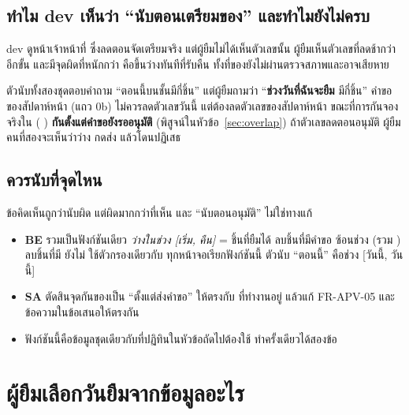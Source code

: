 \subsection{ทำไม dev เห็นว่า ``นับตอนเตรียมของ'' และทำไมยังไม่ครบ}

dev ดูหน้าเจ้าหน้าที่ ซึ่งลดตอนจัดเตรียมจริง แต่ผู้ยืมไม่ได้เห็นตัวเลขนั้น ผู้ยืมเห็นตัวเลขที่ลดช้ากว่าอีกขั้น
และมีจุดผิดที่หนักกว่า คือขึ้นว่างทันทีที่รับคืน ทั้งที่ของยังไม่ผ่านตรวจสภาพและอาจเสียหาย

\begin{warnbox}[title={กับดัก --- ย้ายจุดนับไปตอนอนุมัติ ตัวเลขก็ยังผิด}]
ตัวนับทั้งสองชุดตอบคำถาม ``ตอนนี้บนชั้นมีกี่ชิ้น'' แต่ผู้ยืมถามว่า ``\textbf{ช่วงวันที่ฉันจะยืม} มีกี่ชิ้น''
คำขอของสัปดาห์หน้า (แถว 0b) ไม่ควรลดตัวเลขวันนี้ แต่ต้องลดตัวเลขของสัปดาห์หน้า
ขณะที่การกันจองจริงใน  ( )
\textbf{กันตั้งแต่คำขอยังรออนุมัติ} (พิสูจน์ในหัวข้อ~\ref{sec:overlap}) ถ้าตัวเลขลดตอนอนุมัติ
ผู้ยืมคนที่สองจะเห็นว่าว่าง กดส่ง แล้วโดนปฏิเสธ 
\end{warnbox}

\subsection{ควรนับที่จุดไหน}

\vpart{} ข้อคิดเห็นถูกว่านับผิด แต่ผิดมากกว่าที่เห็น และ ``นับตอนอนุมัติ'' ไม่ใช่ทางแก้

\begin{itemize}
\item \textbf{BE} รวมเป็นฟังก์ชันเดียว \emph{ว่างในช่วง [เริ่ม, คืน]} = ชิ้นที่ยืมได้ ลบชิ้นที่มีคำขอ  ซ้อนช่วง
      (รวม ) ลบชิ้นที่มี  ยังไม่  ใช้ตัวกรองเดียวกับ 
      ทุกหน้าจอเรียกฟังก์ชันนี้ ตัวนับ ``ตอนนี้'' คือช่วง [วันนี้, วันนี้]
\item \textbf{SA} ตัดสินจุดกันของเป็น ``ตั้งแต่ส่งคำขอ'' ให้ตรงกับ  ที่ทำงานอยู่ แล้วแก้ FR-APV-05 และข้อความในข้อเสนอให้ตรงกัน
\item ฟังก์ชันนี้คือข้อมูลชุดเดียวกับที่ปฏิทินในหัวข้อถัดไปต้องใช้ ทำครั้งเดียวได้สองข้อ
\end{itemize}

\section{ผู้ยืมเลือกวันยืมจากข้อมูลอะไร}
\label{sec:calendar}

